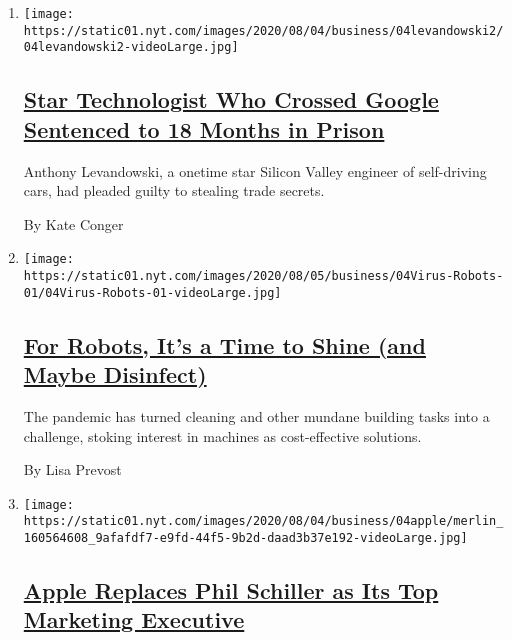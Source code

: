 \begin{enumerate}
\def\labelenumi{\arabic{enumi}.}
\item
  \texttt{[image: https://static01.nyt.com/images/2020/08/04/business/04levandowski2/04levandowski2-videoLarge.jpg]}

  \hypertarget{star-technologist-who-crossed-google-sentenced-to-18-months-in-prison}{%
  \subsection{\texorpdfstring{\href{/2020/08/04/technology/levandowski-google-uber-sentencing-trade-secrets.html}{Star
  Technologist Who Crossed Google Sentenced to 18 Months in
  Prison}}{Star Technologist Who Crossed Google Sentenced to 18 Months in Prison}}\label{star-technologist-who-crossed-google-sentenced-to-18-months-in-prison}}

  Anthony Levandowski, a onetime star Silicon Valley engineer of
  self-driving cars, had pleaded guilty to stealing trade secrets.

  By Kate Conger
\item
  \texttt{[image: https://static01.nyt.com/images/2020/08/05/business/04Virus-Robots-01/04Virus-Robots-01-videoLarge.jpg]}

  \hypertarget{for-robots-its-a-time-to-shine-and-maybe-disinfect}{%
  \subsection{\texorpdfstring{\href{/2020/08/04/business/robot-cleaning-coronavirus.html}{For
  Robots, It's a Time to Shine (and Maybe
  Disinfect)}}{For Robots, It's a Time to Shine (and Maybe Disinfect)}}\label{for-robots-its-a-time-to-shine-and-maybe-disinfect}}

  The pandemic has turned cleaning and other mundane building tasks into
  a challenge, stoking interest in machines as cost-effective solutions.

  By Lisa Prevost
\item
  \texttt{[image: https://static01.nyt.com/images/2020/08/04/business/04apple/merlin\_160564608\_9afafdf7-e9fd-44f5-9b2d-daad3b37e192-videoLarge.jpg]}

  \hypertarget{apple-replaces-phil-schiller-as-its-top-marketing-executive}{%
  \subsection{\texorpdfstring{\href{/2020/08/04/technology/apple-schiller-marketing-executive-departure.html}{Apple
  Replaces Phil Schiller as Its Top Marketing
  Executive}}{Apple Replaces Phil Schiller as Its Top Marketing Executive}}\label{apple-replaces-phil-schiller-as-its-top-marketing-executive}}


\end{enumerate}
